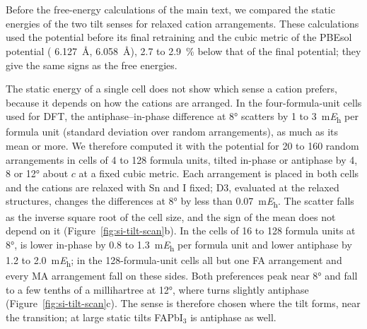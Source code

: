 \section{\protect{}}
\label{si:tilt-scan}
{\changedcolor
Before the free-energy calculations of the main text, we compared the static energies of the two tilt senses for relaxed cation arrangements. These calculations used the \rSCAN{} potential before its final retraining and the cubic metric of the PBEsol potential (\FASnI{} \SI{6.127}{\angstrom}, \MASnI{} \SI{6.058}{\angstrom}), 2.7 to \SI{2.9}{\percent} below that of the final potential; they give the same signs as the free energies.

The static energy of a single cell does not show which sense a cation prefers, because it depends on how the cations
are arranged. In the four-formula-unit cells used for DFT, the antiphase--in-phase difference at \ang{8} scatters by
1 to \SI{3}{\milli\hartree} per formula unit (standard deviation over random arrangements), as much as its mean or
more. We therefore
computed it with the \rSCAN{} potential for 20 to 160 random arrangements in cells of 4 to 128 formula units, tilted in-phase
or antiphase by 4, 8 or \ang{12} about $c$ at a fixed cubic metric. Each arrangement is placed in both cells and the
cations are relaxed with Sn and I fixed; D3, evaluated at the relaxed structures, changes the differences at \ang{8} by
less than \SI{0.07}{\milli\hartree}. The scatter falls as the inverse square root of the cell size, and the sign of
the mean does not depend on it (Figure~\ref{fig:si-tilt-scan}b). In the cells of 16 to 128 formula units at \ang{8},
\FASnI{} is lower in-phase by 0.8 to \SI{1.3}{\milli\hartree} per formula unit
and \MASnI{} lower antiphase by 1.2 to \SI{2.0}{\milli\hartree}; in the 128-formula-unit cells all
but one FA arrangement and every MA arrangement fall on these sides. Both preferences peak near \ang{8} and fall to a
few tenths of a millihartree at \ang{12}, where \FASnI{} turns slightly antiphase (Figure~\ref{fig:si-tilt-scan}c).
The sense is therefore chosen where the tilt forms, near the transition; at large static tilts FAPbI$_3$ is antiphase
as well.\cite{Dutta2025JACS}

}
